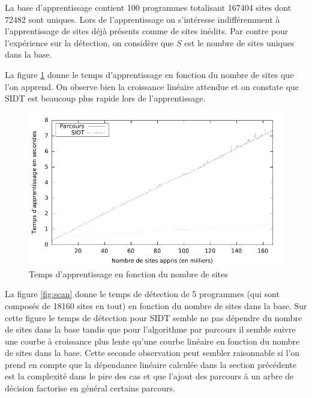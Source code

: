 La base d'apprentissage contient 100 programmes totalisant 167404 sites dont 72482 sont uniques. Lors de l'apprentissage on s'intéresse indifféremment à l'apprentissage de sites déjà présents comme de sites inédits. Par contre pour l'expérience sur la détection, on considère que $S$ est le nombre de sites uniques dans la base.

La figure \ref{fig:apprentissage} donne le temps d'apprentissage en fonction du nombre de sites que l'on apprend.
On observe bien la croissance linéaire attendue et on constate que SIDT est beaucoup plus rapide lors de l'apprentissage.

\begin{figure}[h]
\begin{center}
\includegraphics{supports/plots/plotLearn.pdf}
\end{center}
\caption{Temps d'apprentissage en fonction du nombre de sites}
\label{fig:apprentissage}
\end{figure}

La figure \ref{fig:scan} donne le temps de détection de 5 programmes (qui sont composés de 18160 sites en tout) en fonction du nombre de sites dans la base.
Sur cette figure le temps de détection pour SIDT semble ne pas dépendre du nombre de sites dans la base tandis que pour l'algorithme par parcours il semble suivre une courbe à croissance plus lente qu'une courbe linéaire en fonction du nombre de sites dans la base.
Cette seconde observation peut sembler raisonnable si l'on prend en compte que la dépendance linéaire calculée dans la section précédente est la complexité dans le pire des cas et que l'ajout des parcours à un arbre de décision factorise en général certains parcours.

